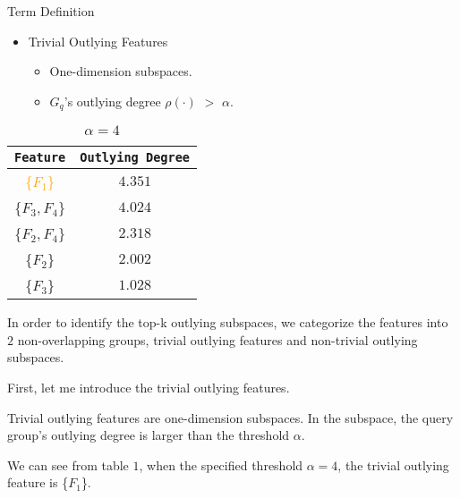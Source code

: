 \documentclass[
size=14pt,
paper=smartboard,  %
mode=present, 		%
display=slides, 	%
style=tuliplab,  	%
pauseslide,
fleqn,leqno]{powerdot}
\begin{document}
	
	\begin{slide}[toc=,bm=]{Term Definition}
		\begin{itemize}
			\item
			Trivial Outlying Features
			
			\begin{itemize}
				\item
				\smallskip
				One-dimension subspaces.
				
				\item
				${G_q}$'s outlying degree $\rho(\cdot)$ $>$ $\alpha$.
			\end{itemize}
		\end{itemize}
		\begin{table}
			\setlength{\abovecaptionskip}{0pt}
			\setlength{\belowcaptionskip}{10pt}
			\centering
			\caption{$\alpha = 4$}
			
			\begin{tabular}{  c  |  c }
				\toprule
				\centering
				\texttt{Feature}  & \texttt{Outlying Degree}  \\
				\midrule
				{\textcolor{orange}{\{$F_1$\}}} & $4.351$ \\
				{\{$F_3, F_4$\}}                & $4.024$ \\
				{\{$F_2, F_4$\}}                & $2.318$ \\
				{\{$F_2$\}}                     & $2.002$ \\
				{\{$F_3$\}}                     & $1.028$ \\
				\bottomrule
			\end{tabular}
		\end{table}
		
		\begin{note}
			In order to identify the top-k outlying subspaces,
			we categorize the features into $2$ non-overlapping groups,
			trivial outlying features and non-trivial outlying subspaces.
			
			First, let me introduce the trivial outlying features.
			
			Trivial outlying features are one-dimension subspaces.
			In the subspace,
			the query group's outlying degree is larger than the threshold $\alpha$.
			
			We can see from table $1$,
			when the specified threshold $\alpha = 4$,
			the trivial outlying feature is \{$F_1$\}.
		\end{note}
		
	\end{slide}
	
\end{document}
